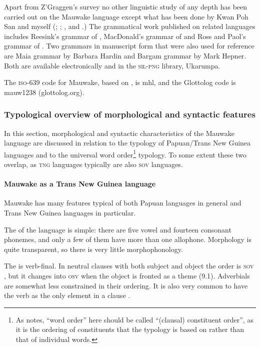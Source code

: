 Apart from Z'Graggen's survey no other linguistic study of any depth has been carried out on the Mauwake language except what has been done by Kwan Poh San and myself (\citealt{Kwan1980, Kwan1983, Kwan1988, Kwan1989, Kwan2002}; \citealt{Jarvinen1980,Jarvinen1988a,Jarvinen1988b,Jarvinen1989,Jarvinen1990,Jarvinen1991}; \citealt{JarvinenEtAl2001}, and \citealt{Berghall2006}.)  The grammatical work published on related languages includes Reesink's grammar of \citet{Usan1987}, MacDonald's grammar of \citet{Tauya1990} and Ross and Paol's grammar of \citet{Waskia1978}. Two grammars in manuscript form that were also used for reference are Maia grammar by Barbara Hardin and Bargam grammar by Mark Hepner. Both are available electronically and in the \textsc{sil-png} library, Ukarumpa.

The \textsc{iso}-639 code for Mauwake, based on \citet{Grimes2000}, is mhl, and the Glottolog code is mauw1238 (glottolog.org).

\subsubsection{Typological overview of morphological and syntactic features}
In this section, morphological and syntactic characteristics of the Mauwake language are discussed in relation to the typology of Papuan/Trans New Guinea languages and to the universal word order\footnote{As \citet[72]{Dixon2009} notes, ``word order'' here should be called ``(clausal) constituent order'', as it is the ordering of constituents that the typology is based on rather than that of individual words.}  typology.  To some extent these two overlap, as \textsc{tng} languages typically are also \textsc{sov} languages.

\paragraph[Mauwake as a Trans New Guinea language]{Mauwake as a Trans New Guinea language}
Mauwake has many features typical of both Papuan languages in general and Trans New Guinea languages in particular. 

The  of the language is simple: there are five vowel and fourteen consonant phonemes, and only a few of them have more than one allophone.  Morphology is quite transparent, so there is very little morphophonology.

The   is verb-final. In neutral clauses with both subject and object the order is \textsc{sov} , but it changes into \textsc{osv} when the object is fronted  as a theme (9.1).  Adverbials are somewhat less constrained in their ordering. It is also very common to have the verb as the only element in a clause . 

